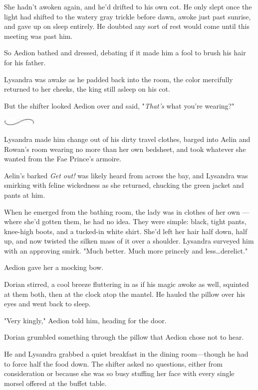 She hadn't awoken again, and he'd drifted to his own cot.
He only slept once the light had shifted to the watery gray trickle before dawn, awoke just past sunrise, and gave up on sleep entirely.
He doubted any sort of rest would come until this meeting was past him.

So Aedion bathed and dressed, debating if it made him a fool to brush his hair for his father.

Lysandra was awake as he padded back into the room, the color mercifully returned to her cheeks, the king still asleep on his cot.

But the shifter looked Aedion over and said, "\emph{That's} what you're wearing?"

\begin{center}
	\includegraphics[width=0.65in,height=0.13in]{images/seperator}
\end{center}

Lysandra made him change out of his dirty travel clothes, barged into Aelin and Rowan's room wearing no more than her own bedsheet, and took whatever she wanted from the Fae Prince's armoire.

Aelin's barked \emph{Get out!} was likely heard from across the bay, and Lysandra was smirking with feline wickedness as she returned, chucking the green jacket and pants at him.

When he emerged from the bathing room, the lady was in clothes of her own ---where she'd gotten them, he had no idea.
They were simple: black, tight pants, knee-high boots, and a tucked-in white shirt.
She'd left her hair half down, half up, and now twisted the silken mass of it over a shoulder.
Lysandra surveyed him with an approving smirk.
"Much better.
Much more princely and less\ldots derelict."

Aedion gave her a mocking bow.

Dorian stirred, a cool breeze fluttering in as if his magic awoke as well, squinted at them both, then at the clock atop the mantel.
He hauled the pillow over his eyes and went back to sleep.

"Very kingly," Aedion told him, heading for the door.

Dorian grumbled something through the pillow that Aedion chose not to hear.

He and Lysandra grabbed a quiet breakfast in the dining room---though he had to force half the food down.
The shifter asked no questions, either from consideration or because she was so busy stuffing her face with every single morsel offered at the buffet table.

